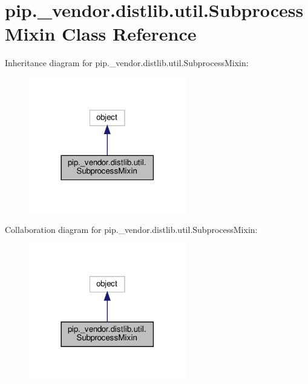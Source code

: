 \hypertarget{classpip_1_1__vendor_1_1distlib_1_1util_1_1SubprocessMixin}{}\section{pip.\+\_\+vendor.\+distlib.\+util.\+Subprocess\+Mixin Class Reference}
\label{classpip_1_1__vendor_1_1distlib_1_1util_1_1SubprocessMixin}


Inheritance diagram for pip.\+\_\+vendor.\+distlib.\+util.\+Subprocess\+Mixin\+:
\nopagebreak
\begin{figure}[H]
\begin{center}
\leavevmode
\includegraphics[width=194pt]{classpip_1_1__vendor_1_1distlib_1_1util_1_1SubprocessMixin__inherit__graph}
\end{center}
\end{figure}


Collaboration diagram for pip.\+\_\+vendor.\+distlib.\+util.\+Subprocess\+Mixin\+:
\nopagebreak
\begin{figure}[H]
\begin{center}
\leavevmode
\includegraphics[width=194pt]{classpip_1_1__vendor_1_1distlib_1_1util_1_1SubprocessMixin__coll__graph}
\end{center}
\end{figure}
